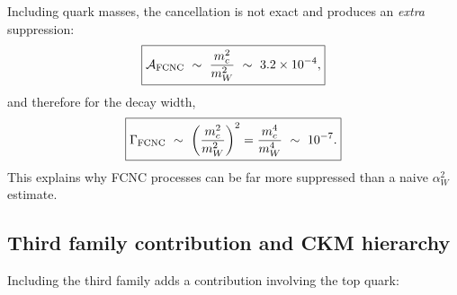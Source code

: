 Including quark masses, the cancellation is not exact and produces an \emph{extra} suppression:
\begin{equation}
\boxed{
\mathcal A_{\rm FCNC}\ \sim\ \frac{m_c^2}{m_W^2}\ \sim\ 3.2\times 10^{-4},
}
\end{equation}
and therefore for the decay width,
\begin{equation}
\boxed{
\Gamma_{\rm FCNC}\ \sim\ \left(\frac{m_c^2}{m_W^2}\right)^2
=\frac{m_c^4}{m_W^4}\ \sim\ 10^{-7}.
}
\end{equation}
This explains why FCNC processes can be far more suppressed than a naive $\alpha_W^2$ estimate.

\subsection{Third family contribution and CKM hierarchy}
Including the third family adds a contribution involving the top quark:
